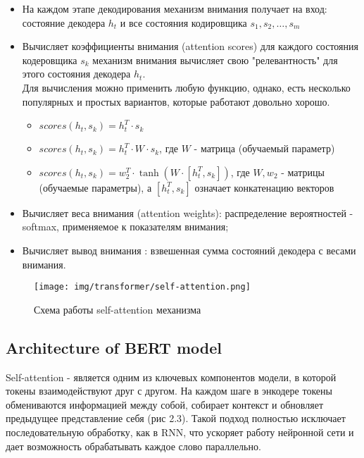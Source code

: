 \documentclass[PMI,VKR]{HSEUniversity}
\begin{document}
\begin{itemize}
    \item На каждом этапе декодирования механизм внимания получает на вход: состояние декодера $h_t$ и все состояния кодировщика $s_1, s_2, \dots, s_m$ 
    \item Вычисляет коэффициенты внимания (attention scores) для каждого состояния кодеровщика $s_k$ механизм внимания вычисляет свою "релевантность" для этого состояния декодера $h_t$. \\
    Для вычисления можно применить любую функцию, однако, есть несколько популярных и простых вариантов, которые работают довольно хорошо.
    \begin{itemize}
        \item $scores(h_t, s_k) = h_t^T \cdot s_k $
        \item $scores(h_t, s_k) = h_t^T \cdot W \cdot s_k $, где $W$ - матрица (обучаемый параметр)
        \item $scores(h_t, s_k) = w_2^T \cdot \tanh(W \cdot [h_t^T, s_k]) $, где $W, w_2$ - матрицы (обучаемые параметры), а $[h_t^T, s_k]$ означает конкатенацию векторов 
    \end{itemize}

    \item Вычисляет веса внимания (attention weights): распределение вероятностей - softmax, применяемое к показателям внимания;
    \item Вычисляет вывод внимания : взвешенная сумма состояний декодера с весами внимания.
\end{itemize}

\begin{figure}[h]
    \centering
    \texttt{[image: img/transformer/self-attention.png]}
    \caption{Схема работы self-attention механизма}
\end{figure}

\subsection{Architecture of BERT model}

 Self-attention - является одним из ключевых компонентов модели, в которой токены взаимодействуют друг с другом. На каждом шаге в энкодере токены обмениваются информацией между собой, собирает контекст и обновляет предыдущее представление себя (рис 2.3). Такой подход полностью исключает последовательную обработку, как в RNN, что ускоряет работу нейронной сети и дает возможность обрабатывать каждое слово параллельно.
\end{document}
